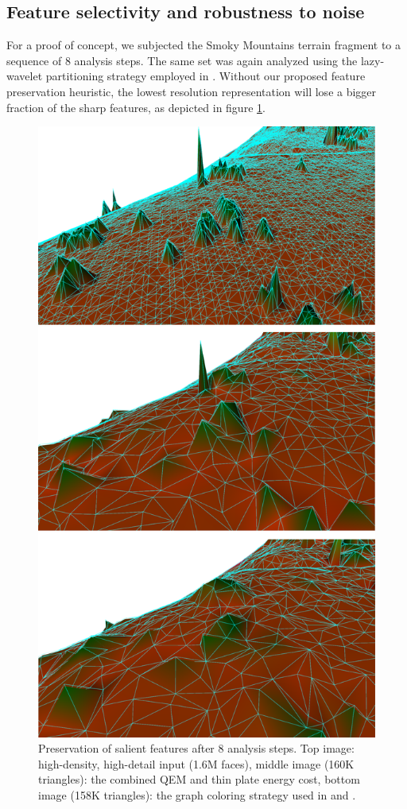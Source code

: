 \documentclass[graybox]{svmult}
\begin{document}
	\subsection{Feature selectivity and robustness to noise}
	For a proof of concept, we subjected the Smoky Mountains terrain fragment to a sequence of 8 analysis steps. The same set was again analyzed using the lazy-wavelet partitioning strategy employed in \cite{Wagner2005, Martinez2011}. Without our proposed feature preservation
	heuristic, the lowest resolution representation will lose a bigger fraction of the sharp features, as depicted in figure \ref{fig_cds:sharpFeatures}.
	
	\begin{figure}[!htbp]
		\centering
		\includegraphics[width=0.75\linewidth]{QEMvsNO.png}
		\caption{\label{fig_cds:sharpFeatures}
			Preservation of salient features after 8 analysis steps. Top image: high-density, high-detail input (1.6M faces), middle image (160K triangles): the combined QEM and thin plate energy cost, bottom image (158K triangles): the graph coloring strategy used in \cite{Wagner2005} and \cite{Martinez2011}. }
	\end{figure}
	
\end{document}
